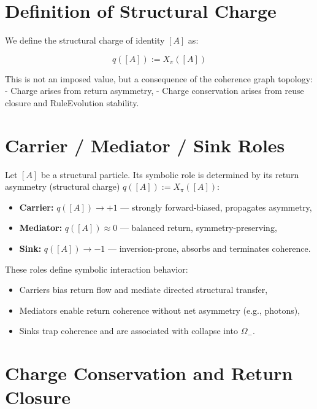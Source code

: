 \section{Definition of Structural Charge} \label{sec:structural-charge}

We define the structural charge of identity $[A]$ as:

\begin{equation}
q([A]) := X_\pi([A])
\end{equation}

This is not an imposed value, but a consequence of the coherence graph topology:
- Charge arises from return asymmetry,
- Charge conservation arises from reuse closure and RuleEvolution stability.

\section{Carrier / Mediator / Sink Roles} \label{sec:charge-roles}

Let $[A]$ be a structural particle. Its symbolic role is determined by its return asymmetry (structural charge) $q([A]) := X_\pi([A])$:

\begin{itemize}
  \item \textbf{Carrier:} $q([A]) \to +1$ — strongly forward-biased, propagates asymmetry,
  \item \textbf{Mediator:} $q([A]) \approx 0$ — balanced return, symmetry-preserving,
  \item \textbf{Sink:} $q([A]) \to -1$ — inversion-prone, absorbs and terminates coherence.
\end{itemize}

These roles define symbolic interaction behavior:
\begin{itemize}
  \item Carriers bias return flow and mediate directed structural transfer,
  \item Mediators enable return coherence without net asymmetry (e.g., photons),
  \item Sinks trap coherence and are associated with collapse into $\Omega_-$.
\end{itemize}

\section{Charge Conservation and Return Closure} \label{sec:charge-conservation}

